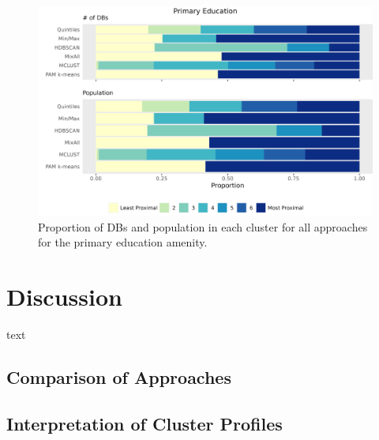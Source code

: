 \documentclass[11pt, a4paper]{article}
\begin{document}
\begin{figure}[H]
\centering
\includegraphics[width=\textwidth]{./barplot_comparison/Primary Education_barplot.png}
\caption[Primary education profile barplot]{Proportion of DBs and population in each cluster for all approaches for the primary education amenity.}\label{prieducbarplot}
\end{figure}










\pagebreak 
\section{Discussion}




text 







\subsection{Comparison of Approaches}


















\subsection{Interpretation of Cluster Profiles}
\end{document}
